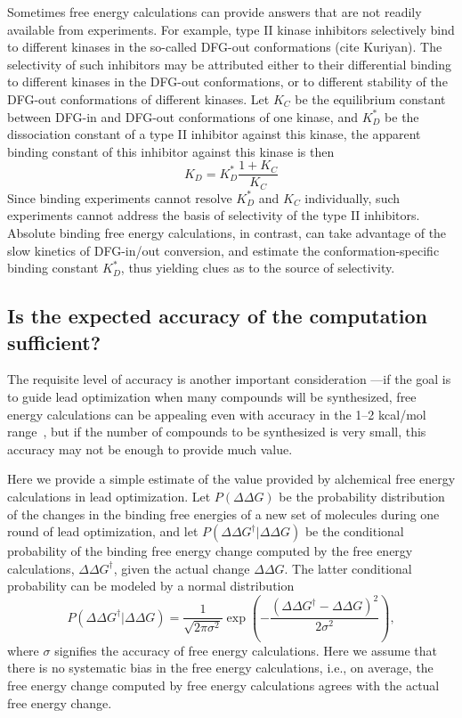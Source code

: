 \documentclass[9pt,bestpractices]{livecoms}
\begin{document}
Sometimes free energy calculations can provide answers that are not
readily available from experiments.  For example, type II kinase
inhibitors selectively bind to different kinases in the so-called
DFG-out conformations (cite Kuriyan).  The selectivity of such
inhibitors may be attributed either to their differential binding to
different kinases in the DFG-out conformations, or to different
stability of the DFG-out conformations of different kinases.  Let
$K_C$ be the equilibrium constant between DFG-in and DFG-out
conformations of one kinase, and $K_D^\ast$ be the dissociation
constant of a type II inhibitor against this kinase, the apparent
binding constant of this inhibitor against this kinase is then
\begin{equation}
  K_D = K_D^\ast \frac{1 + K_C}{K_C}
  \label{eqn:conformational-binding}
\end{equation}
%
Since binding experiments cannot resolve $K_D^\ast$ and $K_C$ individually, such experiments cannot address the basis of selectivity of the type II inhibitors.  Absolute binding free energy calculations, in contrast, can take advantage of the slow kinetics of DFG-in/out conversion, and estimate the conformation-specific binding constant $K_D^\ast$, thus yielding clues as to the source of selectivity.
%
\subsection{Is the expected accuracy of the computation sufficient?}
\label{subsec:accuracy}
The requisite level of accuracy is another important consideration ---if the
goal is to guide lead optimization when many compounds will be
synthesized, free energy calculations can be appealing even with
accuracy in the 1--2 kcal/mol range~\cite{mobley2012perspective}, but if the number of compounds to be synthesized is very small, this accuracy may not be enough to provide
much value.

Here we provide a simple estimate of the value provided by alchemical
free energy calculations in lead optimization.  Let $P(\Delta\Delta
G)$ be the probability distribution of the changes in the binding free
energies of a new set of molecules during one round of lead
optimization, and let $P(\Delta\Delta G^\dagger|\Delta\Delta G)$ be the
conditional probability of the binding free energy change computed by
the free energy calculations, $\Delta\Delta G^\dagger$, given the actual
change $\Delta\Delta G$.  The latter conditional probability can be modeled
by a normal distribution
\begin{equation}
  P(\Delta\Delta G^\dagger|\Delta\Delta G) = \frac{1}{\sqrt{2\pi\sigma^2}}
  \exp\left(-\frac{(\Delta\Delta G^\dagger - \Delta\Delta G)^2}{2\sigma^2}\right),
  \label{eqn:free-energy-distribution}
\end{equation}
where $\sigma$ signifies the accuracy of free energy calculations.
Here we assume that there is no systematic bias in the free energy
calculations, i.e., on average, the free energy change computed by
free energy calculations agrees with the actual free energy change.
\end{document}
